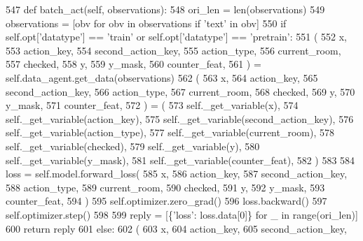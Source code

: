 \begin{DoxyCode}
547     \textcolor{keyword}{def }batch\_act(self, observations):
548         ori\_len = len(observations)
549         observations = [obv \textcolor{keywordflow}{for} obv \textcolor{keywordflow}{in} observations \textcolor{keywordflow}{if} \textcolor{stringliteral}{'text'} \textcolor{keywordflow}{in} obv]
550         \textcolor{keywordflow}{if} self.opt[\textcolor{stringliteral}{'datatype'}] == \textcolor{stringliteral}{'train'} \textcolor{keywordflow}{or} self.opt[\textcolor{stringliteral}{'datatype'}] == \textcolor{stringliteral}{'pretrain'}:
551             (
552                 x,
553                 action\_key,
554                 second\_action\_key,
555                 action\_type,
556                 current\_room,
557                 checked,
558                 y,
559                 y\_mask,
560                 counter\_feat,
561             ) = self.data\_agent.get\_data(observations)
562             (
563                 x,
564                 action\_key,
565                 second\_action\_key,
566                 action\_type,
567                 current\_room,
568                 checked,
569                 y,
570                 y\_mask,
571                 counter\_feat,
572             ) = (
573                 self.\_get\_variable(x),
574                 self.\_get\_variable(action\_key),
575                 self.\_get\_variable(second\_action\_key),
576                 self.\_get\_variable(action\_type),
577                 self.\_get\_variable(current\_room),
578                 self.\_get\_variable(checked),
579                 self.\_get\_variable(y),
580                 self.\_get\_variable(y\_mask),
581                 self.\_get\_variable(counter\_feat),
582             )
583 
584             loss = self.model.forward\_loss(
585                 x,
586                 action\_key,
587                 second\_action\_key,
588                 action\_type,
589                 current\_room,
590                 checked,
591                 y,
592                 y\_mask,
593                 counter\_feat,
594             )
595             self.optimizer.zero\_grad()
596             loss.backward()
597             self.optimizer.step()
598 
599             reply = [\{\textcolor{stringliteral}{'loss'}: loss.data[0]\} \textcolor{keywordflow}{for} \_ \textcolor{keywordflow}{in} range(ori\_len)]
600             \textcolor{keywordflow}{return} reply
601         \textcolor{keywordflow}{else}:
602             (
603                 x,
604                 action\_key,
605                 second\_action\_key,

\end{DoxyCode}
